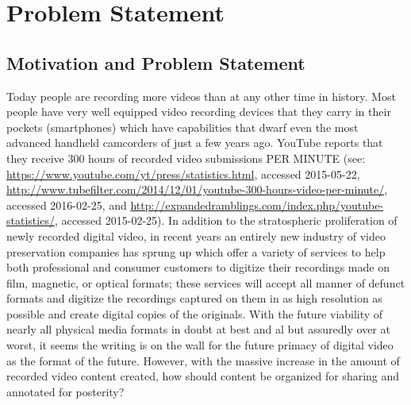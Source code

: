 %
\chapter{Problem Statement}
\label{sec:problem-statement}



%
%
%

\section{Motivation and Problem Statement}
\label{sec:problem-statement:motivation}


%


Today people are recording more videos than at any other time in history. Most people have very well equipped video recording devices that they carry in their pockets (smartphones) which have capabilities that dwarf even the most advanced handheld camcorders of just a few years ago.  YouTube reports that they receive 300 hours of recorded video submissions PER MINUTE (see: \url{https://www.youtube.com/yt/press/statistics.html}, accessed 2015-05-22, \url{http://www.tubefilter.com/2014/12/01/youtube-300-hours-video-per-minute/}, accessed 2016-02-25, and \url{http://expandedramblings.com/index.php/youtube-statistics/}, accessed 2015-02-25).  In addition to the stratospheric proliferation of newly recorded digital video, in recent years an entirely new industry of video preservation companies has sprung up which offer a variety of services to help both professional and consumer customers to digitize their recordings made on film, magnetic, or optical formats; these services will accept all manner of defunct formats and digitize the recordings captured on them in as high resolution as possible and create digital copies of the originals.  With the future viability of nearly all physical media formats in doubt at best and al but assuredly over at worst, it seems the writing is on the wall for the future primacy of digital video as the format of the future.  However, with the massive increase in the amount of recorded video content created, how should content be organized for sharing and annotated for posterity?

